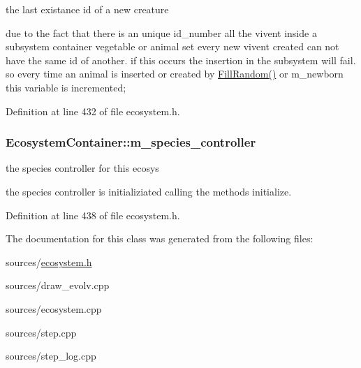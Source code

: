 the last existance id of a new creature 

due to the fact that there is an unique id\_\-number all the vivent inside a subsystem container vegetable or animal set every new vivent created can not have the same id of another. if this occurs the insertion in the subsystem will fail. so every time an animal is inserted or created by \hyperlink{classEcosystemContainer_acc91c956fd0afc63a055c7072e250914}{FillRandom()} or m\_\-newborn this variable is incremented; 

Definition at line 432 of file ecosystem.h.

\hypertarget{classEcosystemContainer_a41211c58341df2a0ef7ee44b69151de0}{
\subsubsection[{m\_\-species\_\-controller}]{ {\bf EcosystemContainer::m\_\-species\_\-controller}}}
\label{classEcosystemContainer_a41211c58341df2a0ef7ee44b69151de0}


the species controller for this ecosys 

the species controller is initializiated calling the methods initialize. 

Definition at line 438 of file ecosystem.h.



The documentation for this class was generated from the following files:\begin{DoxyCompactItemize}
\item 
sources/\hyperlink{ecosystem_8h}{ecosystem.h}\item 
sources/draw\_\-evolv.cpp\item 
sources/ecosystem.cpp\item 
sources/step.cpp\item 
sources/step\_\-log.cpp\end{DoxyCompactItemize}
